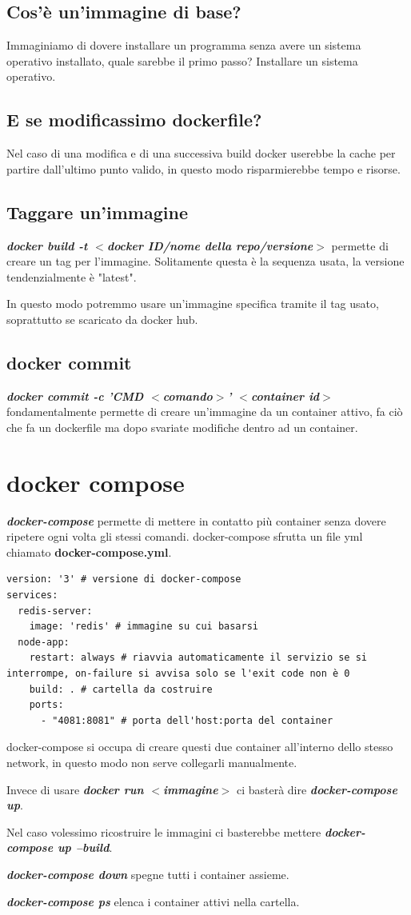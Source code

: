 \documentclass[11pt,a4paper]{book}
\begin{document}
\section{Cos'è un'immagine di base?}
Immaginiamo di dovere installare un programma senza avere un sistema operativo installato, quale sarebbe il primo passo? Installare un sistema operativo.

\section{E se modificassimo dockerfile?}
Nel caso di una modifica e di una successiva build docker userebbe la cache per partire dall'ultimo punto valido, in questo modo risparmierebbe tempo e risorse.

\section{Taggare un'immagine}
\emph{\textbf{docker build -t $<$docker ID/nome della repo/versione$>$}} permette di creare un tag per l'immagine. Solitamente questa è la sequenza usata, la versione tendenzialmente è "latest".

In questo modo potremmo usare un'immagine specifica tramite il tag usato, soprattutto se scaricato da docker hub.

\section{docker commit}
\emph{\textbf{docker commit -c 'CMD $<$comando$>$' $<$container id$>$}} fondamentalmente permette di creare un'immagine da un container attivo, fa ciò che fa un dockerfile ma dopo svariate modifiche dentro ad un container.

\chapter{docker compose}
\emph{\textbf{docker-compose}} permette di mettere in contatto più container senza dovere ripetere ogni volta gli stessi comandi. docker-compose sfrutta un file yml chiamato \textbf{docker-compose.yml}. 
\begin{lstlisting}
version: '3' # versione di docker-compose
services:
  redis-server:
    image: 'redis' # immagine su cui basarsi
  node-app:
    restart: always # riavvia automaticamente il servizio se si interrompe, on-failure si avvisa solo se l'exit code non è 0
    build: . # cartella da costruire
    ports:
      - "4081:8081" # porta dell'host:porta del container
\end{lstlisting}

docker-compose si occupa di creare questi due container all'interno dello stesso network, in questo modo non serve collegarli manualmente.

Invece di usare \emph{\textbf{docker run $<$immagine$>$}} ci basterà dire \emph{\textbf{docker-compose up}}.

Nel caso volessimo ricostruire le immagini ci basterebbe mettere \emph{\textbf{docker-compose up --build}}.


\emph{\textbf{docker-compose down}} spegne tutti i container assieme.

\emph{\textbf{docker-compose ps}} elenca i container attivi nella cartella.
\end{document}
